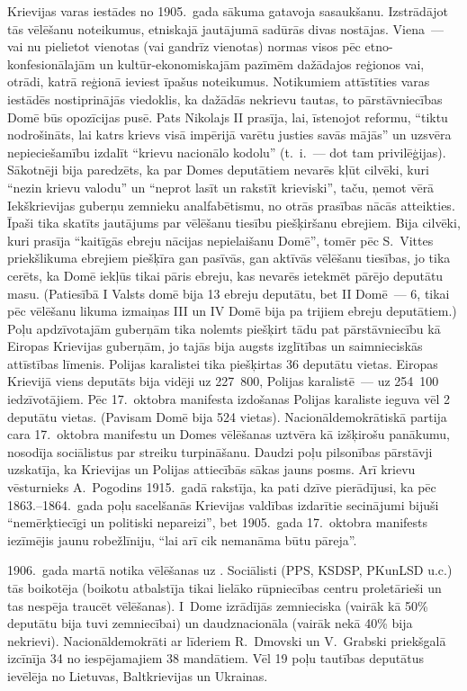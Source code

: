 \documentclass[twoside,a5paper,12pt,fleqn,openany]{extbook}
\begin{document}
Krievijas varas iestādes no 1905.~gada sākuma gatavoja  sasaukšanu. Izstrādājot tās vēlēšanu noteikumus, etniskajā jautājumā sadūrās divas nostājas. Viena~--- vai nu pielietot vienotas (vai gandrīz vienotas) normas visos pēc etno-konfesionālajām un kultūr-ekonomiskajām pazīmēm dažādajos reģionos vai, otrādi, katrā reģionā ieviest īpašus noteikumus. Notikumiem attīstīties varas iestādēs nostiprinājās viedoklis, ka dažādās nekrievu tautas, to pārstāvniecības Domē būs opozīcijas pusē. Pats Nikolajs II prasīja, lai, īstenojot reformu, ``tiktu nodrošināts, lai katrs krievs visā impērijā varētu justies savās mājās'' un uzsvēra nepieciešamību izdalīt ``krievu nacionālo kodolu'' (t.~i.~--- dot tam privilēģijas). Sākotnēji bija paredzēts, ka par Domes deputātiem nevarēs kļūt cilvēki, kuri ``nezin krievu valodu'' un ``neprot lasīt un rakstīt krieviski'', taču, ņemot vērā Iekškrievijas guberņu zemnieku analfabētismu, no otrās prasības nācās atteikties. Īpaši tika skatīts jautājums par vēlēšanu tiesību piešķiršanu ebrejiem. Bija cilvēki, kuri prasīja ``kaitīgās ebreju nācijas nepielaišanu Domē'', tomēr pēc S.~Vittes priekšlikuma ebrejiem piešķīra gan pasīvās, gan aktīvās vēlēšanu tiesības, jo tika cerēts, ka Domē iekļūs tikai pāris ebreju, kas nevarēs ietekmēt pārējo deputātu masu. (Patiesībā I Valsts domē bija 13 ebreju deputātu, bet II Domē~--- 6, tikai pēc vēlēšanu likuma izmaiņas III un IV Domē bija pa trijiem ebreju deputātiem.) Poļu apdzīvotajām guberņām tika nolemts piešķirt tādu pat pārstāvniecību kā Eiropas Krievijas guberņām, jo tajās bija augsts izglītības un saimnieciskās attīstības līmenis. Polijas karalistei tika piešķirtas 36 deputātu vietas. Eiropas Krievijā viens deputāts bija vidēji uz 227~800, Polijas karalistē~--- uz 254~100 iedzīvotājiem. Pēc 17.~oktobra manifesta izdošanas Polijas karaliste ieguva vēl 2 deputātu vietas. (Pavisam Domē bija 524 vietas). Nacionāldemokrātiskā partija cara 17.~oktobra manifestu un Domes vēlēšanas uztvēra kā izšķirošu panākumu, nosodīja sociālistus par streiku turpināšanu. Daudzi poļu pilsonības pārstāvji uzskatīja, ka Krievijas un Polijas attiecībās sākas jauns posms. Arī krievu vēsturnieks A.~Pogodins 1915.~gadā rakstīja, ka pati dzīve pierādījusi, ka pēc 1863.--1864.~gada poļu sacelšanās Krievijas valdības izdarītie secinājumi bijuši ``nemērķtiecīgi un politiski nepareizi'', bet 1905.~gada 17.~oktobra manifests iezīmējis jaunu robežlīniju, ``lai arī cik nemanāma būtu pāreja''.

1906.~gada martā notika vēlēšanas uz . Sociālisti (PPS, KSDSP, PKunLSD u.c.) tās boikotēja (boikotu atbalstīja tikai lielāko rūpniecības centru proletārieši un tas nespēja traucēt vēlēšanas). I~Dome izrādījās zemnieciska (vairāk kā 50\% deputātu bija tuvi zemniecībai) un daudznacionāla (vairāk nekā 40\% bija nekrievi). Nacionāldemokrāti ar līderiem R.~Dmovski un V.~Grabski priekšgalā izcīnīja 34 no iespējamajiem 38 mandātiem. Vēl 19 poļu tautības deputātus ievēlēja no Lietuvas, Baltkrievijas un Ukrainas.
\end{document}
